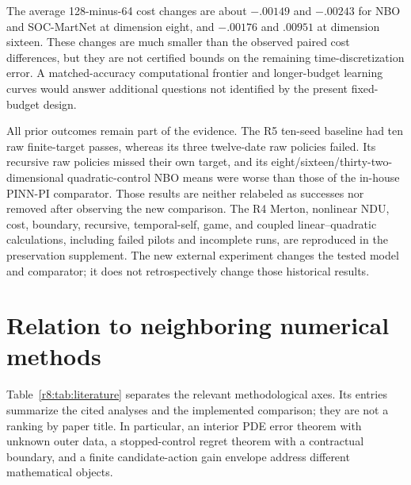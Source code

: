 The average 128-minus-64 cost changes are about $-.00149$ and $-.00243$ for NBO and SOC-MartNet at dimension eight, and $-.00176$ and $.00951$ at dimension sixteen. These changes are much smaller than the observed paired cost differences, but they are not certified bounds on the remaining time-discretization error. A matched-accuracy computational frontier and longer-budget learning curves would answer additional questions not identified by the present fixed-budget design.

All prior outcomes remain part of the evidence. The R5 ten-seed baseline had ten raw finite-target passes, whereas its three twelve-date raw policies failed. Its recursive raw policies missed their own target, and its eight/sixteen/thirty-two-dimensional quadratic-control NBO means were worse than those of the in-house PINN-PI comparator. Those results are neither relabeled as successes nor removed after observing the new comparison. The R4 Merton, nonlinear NDU, cost, boundary, recursive, temporal-self, game, and coupled linear--quadratic calculations, including failed pilots and incomplete runs, are reproduced in the preservation supplement. The new external experiment changes the tested model and comparator; it does not retrospectively change those historical results.

\section{Relation to neighboring numerical methods}\label{r8:related}
Table~\ref{r8:tab:literature} separates the relevant methodological axes. Its entries summarize the cited analyses and the implemented comparison; they are not a ranking by paper title. In particular, an interior PDE error theorem with unknown outer data, a stopped-control regret theorem with a contractual boundary, and a finite candidate-action gain envelope address different mathematical objects.

